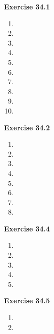 




\textbf{Exercise 34.1}
\begin{enumerate}
    \item 
    \item 
    \item 
    \item 
    \item 
    \item 
    \item 
    \item 
    \item 
    \item 
\end{enumerate}

\textbf{Exercise 34.2}
\begin{enumerate}
    \item 
    \item 
    \item 
    \item 
    \item 
    \item 
    \item 
    \item 
\end{enumerate}

\textbf{Exercise 34.4}
\begin{enumerate}
    \item 
    \item 
    \item 
    \item 
    \item 
\end{enumerate}

\textbf{Exercise 34.5}
\begin{enumerate}
    \item 
    \item 
\end{enumerate}

